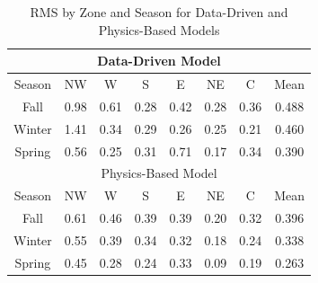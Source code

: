 \begin{table}[hbtp]
\centering
\begin{tabular}{*8c}
\toprule
\multicolumn{8}{c}{Data-Driven Model} \\
\hline
Season & NW & W & S & E & NE & C & Mean \\ \hline
Fall & 0.98 & 0.61 & 0.28 & 0.42 & 0.28 & 0.36 & 0.488\\
Winter & 1.41 & 0.34 & 0.29 & 0.26 & 0.25 & 0.21 & 0.460\\
Spring & 0.56 & 0.25 & 0.31 & 0.71 & 0.17 & 0.34 & 0.390\\
\midrule
\midrule
\multicolumn{8}{c}{Physics-Based Model} \\
\hline
Season & NW & W & S & E & NE & C & Mean \\ \hline
Fall & 0.61 & 0.46 & 0.39 & 0.39 & 0.20 & 0.32 & 0.396\\
Winter & 0.55 & 0.39 & 0.34 & 0.32 & 0.18 & 0.24 & 0.338\\
Spring & 0.45 & 0.28 & 0.24 & 0.33 & 0.09 & 0.19 & 0.263\\
\bottomrule
\end{tabular}
\caption{RMS by Zone and Season for Data-Driven and Physics-Based Models}
\label{tab:data_RMS_zones}
\end{table}


%
